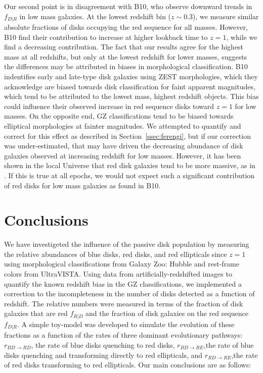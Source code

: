 Our second point is in disagreement with B10, who observe downward trends in $f_{D|R}$ in low mass galaxies. At the lowest redshift bin ($z\sim0.3$), we measure similar absolute fractions of disks occupying the red sequence for all masses. However, B10 find their contribution to increase at higher lookback time to $z=1$, while we find a decreasing contribution. The fact that our results agree for the highest mass at all redshifts, but only at the lowest redshift for lower masses, suggests the differences may be attributed in biases in morphological classification. B10 indentifies early and late-type disk galaxies using ZEST \citep{Scarlata2007} morphologies, which they acknowledge are biased towards disk classification for faint apparent magnitudes, which tend to be attributed to the lowest mass, highest redshift objects. This bias could influence their observed increase in red sequence disks toward $z=1$ for low masses. On the opposite end, GZ classifications tend to be biased towards elliptical morphologies at fainter magnitudes. We attempted to quantify and correct for this effect as described in Section~\ref{ssec:ferengi}, but if our correction was under-estimated, that may have driven the decreasing abundance of disk galaxies observed at increasing redshift for low masses. However, it has been shown in the local Universe that red disk galaxies tend to be more massive, as in \citet{Masters2011}. If this is true at all epochs, we would not expect such a significant contribution of red disks for low mass galaxies as found in B10. 
\section{Conclusions}
\label{sec:conclusions}

We have investigeted the influence of the passive disk population by measuring the relative abundances of blue disks, red disks, and red ellipticals since $z=1$ using morphological classifications from Galaxy Zoo: Hubble and rest-frame colors from UltraVISTA. Using data from artificially-redshifted  images to quantify the known redshift bias in the GZ classifications, we implemented a correction to the incompleteness in the number of disks detected as a function of redshift. The relative numbers were measured in terms of the fraction of disk galaxies that are red $f_{R|D}$ and the fraction of disk galaxies on the red sequence $f_{D|R}$. A simple toy-model was developed to simulate the evolution of these fractions as a function of the rates of three dominant evolutionary pathways: $r_{BD \rightarrow RD}$, the rate of blue disks quenching to red disks, $r_{BD \rightarrow RE}$,the rate of blue disks quenching and transforming directly to red ellipticals, and $r_{RD \rightarrow RE}$,the rate of red disks transforming to red ellipticals. Our main conclusions are as follows:

